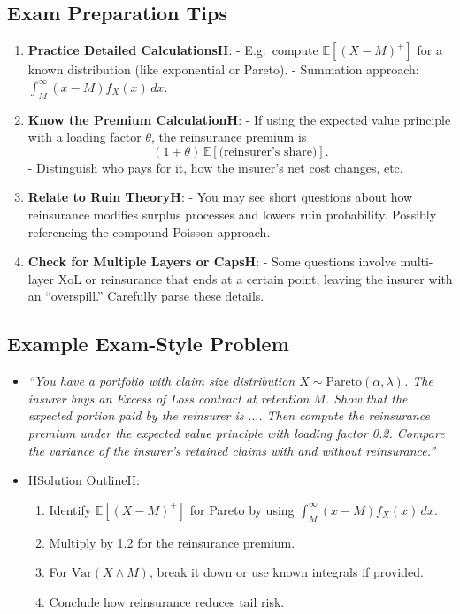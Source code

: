 \documentclass[13pt,a4paper]{article}
\begin{document}
\subsection{Exam Preparation Tips}
\begin{enumerate}
  \item \textbf{Practice Detailed CalculationsH}: 
    - E.g.\ compute \(\mathbb{E}[(X-M)^+]\) for a known distribution (like exponential or Pareto).  
    - Summation approach: \(\int_M^\infty (x-M) f_X(x)\,dx\).
  \item \textbf{Know the Premium CalculationH}: 
    - If using the expected value principle with a loading factor \(\theta\), the reinsurance premium is
      \[
        (1+\theta)\,\mathbb{E}[\text{(reinsurer’s share)}].
      \]
    - Distinguish who pays for it, how the insurer’s net cost changes, etc.
  \item \textbf{Relate to Ruin TheoryH}:
    - You may see short questions about how reinsurance modifies surplus processes and lowers ruin probability. Possibly referencing the compound Poisson approach.
  \item \textbf{Check for Multiple Layers or CapsH}:
    - Some questions involve multi-layer XoL or reinsurance that ends at a certain point, leaving the insurer with an “overspill.” Carefully parse these details.
\end{enumerate}

\subsection{Example Exam-Style Problem}
\begin{itemize}
  \item \emph{“You have a portfolio with claim size distribution \(X\sim \text{Pareto}(\alpha,\lambda)\). The insurer buys an Excess of Loss contract at retention \(M\). Show that the expected portion paid by the reinsurer is \(\ldots\). Then compute the reinsurance premium under the expected value principle with loading factor 0.2. Compare the variance of the insurer’s retained claims with and without reinsurance.”}
  \item HSolution OutlineH:
    \begin{enumerate}
      \item Identify \(\mathbb{E}[(X - M)^+]\) for Pareto by using \(\int_M^\infty (x-M)f_X(x)\,dx\).  
      \item Multiply by 1.2 for the reinsurance premium.  
      \item For \(\mathrm{Var}(X\wedge M)\), break it down or use known integrals if provided.  
      \item Conclude how reinsurance reduces tail risk.
    \end{enumerate}
\end{itemize}
\end{document}
